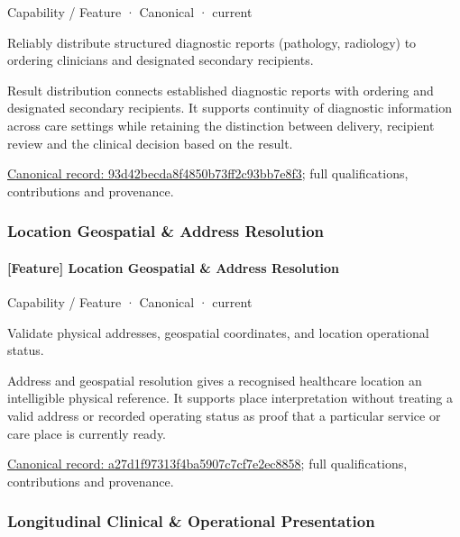 \label{element:93d42becda8f4850b73ff2c93bb7e8f3}
{\small Capability / Feature · Canonical · current}\par

Reliably distribute structured diagnostic reports (pathology, radiology) to ordering clinicians and designated secondary recipients.



Result distribution connects established diagnostic reports with ordering and designated secondary recipients. It supports continuity of diagnostic information across care settings while retaining the distinction between delivery, recipient review and the clinical decision based on the result.


{\footnotesize \href{../../../../continuum/strategy/capability/feature/93d42becda8f4850b73ff2c93bb7e8f3.md}{Canonical record: 93d42becda8f4850b73ff2c93bb7e8f3}; full qualifications, contributions and provenance.}\par
\subsubsection{Location Geospatial \& Address Resolution}

\paragraph{[Feature] Location Geospatial \& Address Resolution}

\label{element:a27d1f97313f4ba5907c7cf7e2ec8858}
{\small Capability / Feature · Canonical · current}\par

Validate physical addresses, geospatial coordinates, and location operational status.



Address and geospatial resolution gives a recognised healthcare location an intelligible physical reference. It supports place interpretation without treating a valid address or recorded operating status as proof that a particular service or care place is currently ready.


{\footnotesize \href{../../../../continuum/strategy/capability/feature/a27d1f97313f4ba5907c7cf7e2ec8858.md}{Canonical record: a27d1f97313f4ba5907c7cf7e2ec8858}; full qualifications, contributions and provenance.}\par
\subsubsection{Longitudinal Clinical \& Operational Presentation}

